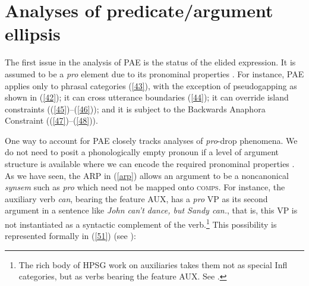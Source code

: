 \section{Analyses of predicate/argument ellipsis}
\label{sec-analyses-of-pred-ellipsis}

The first issue in the analysis of PAE is the status of the elided expression. It is assumed to be a
\textit{pro} element due to its pronominal properties \citep[see][]{Lobeck1995, Lopez2000, Kim2006,
  Aelbrecht2015, Ginzburg2018}. For instance, PAE applies only to phrasal categories (\ref{43}),
with the exception of pseudogapping as shown in (\ref{42}); it can cross utterance boundaries
(\ref{44}); it can override island constraints ((\ref{45})--(\ref{46})); and it is subject to the
Backwards Anaphora Constraint ((\ref{47})--(\ref{48})). 

\z
{}
\z
{}
\z
{}
\z
{}
\z
{}
\z
{}
\z

One way to account for PAE closely tracks analyses of \emph{pro}-drop phenomena. We do not need to posit a phonologically empty pronoun if a level of argument structure is
available where we can encode the required pronominal properties \citep[see][]{Bresnan1982a,Ginzburg:Sag:2000}. As we have seen, the ARP in (\ref{arp})
allows an 
argument to be a noncanonical  \emph{synsem}
such as \textit{pro} which need not be mapped onto \textsc{comps}. 
%
For instance, the auxiliary
verb \textit{can}, bearing the feature AUX, has a \textit{pro} VP as its second argument in a sentence like \textit{John can't dance, but Sandy can.}, that is, this VP is not instantiated as a syntactic complement of the verb.\footnote{The rich body of HPSG work on  auxiliaries takes them not as special Infl categories, but as verbs bearing the feature AUX. See \citet{Kim:00, KS2002a, Sag:Wasow:Bender:2003, Sag2020a, kimmichaelis:2020}.} This possibility is represented formally in (\ref{51}) 
(see \citealt{Kim2006, ginzburg-miller-ellipsis-handbook}):

